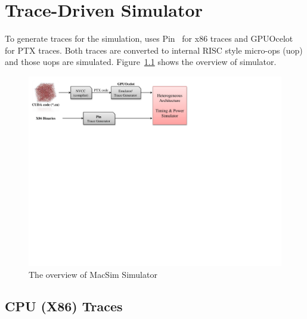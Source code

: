 \chapter{Trace-Driven Simulator}


To generate traces for the simulation, \SIM uses Pin~\cite{pin} for
x86 traces and GPUOcelot~\cite{ocelot} for PTX traces. Both traces are
converted to internal RISC style micro-ops (uop) and those uops are
simulated. Figure~\ref{fig:overview} shows the overview of \SIM
simulator.


\begin{figure}[htb]
\centering \includegraphics{figs/macsim_overview}
\caption{The overview of MacSim Simulator}
\label{fig:overview}
\end{figure}





\section{CPU (X86) Traces}

